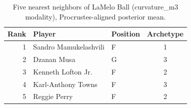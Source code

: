 \begin{table}[htbp]
  \centering\small
  \begin{tabular}{rllc}
    \toprule
    Rank & Player & Position & Archetype \\
    \midrule
    1 & Sandro Mamukelashvili & F & 1 \\
    2 & Dzanan Musa & G & 3 \\
    3 & Kenneth Lofton Jr. & F & 2 \\
    4 & Karl-Anthony Towns & F & 3 \\
    5 & Reggie Perry & F & 2 \\
    \bottomrule
  \end{tabular}
  \caption{Five nearest neighbors of LaMelo Ball (curvature_m3 modality), Procrustes-aligned posterior mean.}
  \label{tab:LaMelo_Ball_neighbors_curvature_m3}
\end{table}


